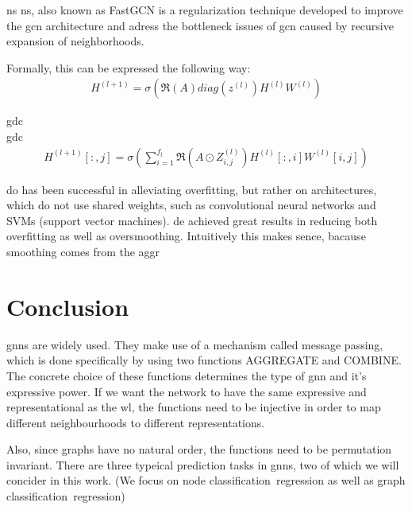 \ac{ns}
\ac{ns}\cite{Chen2018}, also known as FastGCN is a regularization technique
developed to improve the \ac{gcn}\cite{Kipf2017} architecture and adress the bottleneck issues
of \ac{gcn} caused by recursive expansion of neighborhoods.

Formally, this can be expressed the following way:
\begin{align*}
    H^{(l+1)} = \sigma (\mathfrak{R}(A) diag(z^{(l)}) H^{(l)} W^{(l)})
\end{align*}



\ac{gdc} \\
\ac{gdc}\cite{Hasanzadeh2020}
\begin{align*}
    H^{(l+1)}[:,j] = \sigma (\sum_{i=1}^{f_{t}}\mathfrak{R}(A \odot Z_{i,j}^{(l)})H^{(l)}[:,i]W^{(l)}[i,j])
\end{align*}




\acf{do} has been successful in alleviating overfitting, but rather on architectures, which
do not use shared weights, such as convolutional neural networks and SVMs (support vector machines).
\acf{de} achieved great results in reducing both overfitting as well as oversmoothing. Intuitively this
makes sence, bacause smoothing comes from the aggr

\section{Conclusion}
\label{sec:related:conclusion}
\acp{gnn} are widely used. They make use of a mechanism called message passing, which
is done specifically by using two functions AGGREGATE and COMBINE.
The concrete choice of these functions determines the type of \ac{gnn}
and it's expressive power. If we want the network to have the same expressive
and representational as the \ac{wl}, the functions need to be injective in order
to map different neighbourhoods to different representations.

Also, since graphs have no natural order, the functions need to be permutation
invariant.
There are three typeical prediction tasks in \acp{gnn}, two of which we will concider
in this work. (We focus on node classification\ regression as well as
graph classification\ regression)